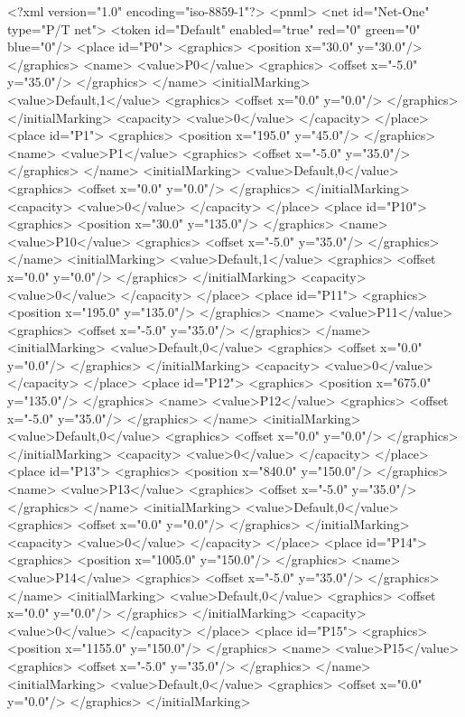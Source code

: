 <?xml version="1.0" encoding="iso-8859-1"?>
<pnml>
<net id="Net-One" type="P/T net">
<token id="Default" enabled="true" red="0" green="0" blue="0"/>
<place id="P0">
<graphics>
<position x="30.0" y="30.0"/>
</graphics>
<name>
<value>P0</value>
<graphics>
<offset x="-5.0" y="35.0"/>
</graphics>
</name>
<initialMarking>
<value>Default,1</value>
<graphics>
<offset x="0.0" y="0.0"/>
</graphics>
</initialMarking>
<capacity>
<value>0</value>
</capacity>
</place>
<place id="P1">
<graphics>
<position x="195.0" y="45.0"/>
</graphics>
<name>
<value>P1</value>
<graphics>
<offset x="-5.0" y="35.0"/>
</graphics>
</name>
<initialMarking>
<value>Default,0</value>
<graphics>
<offset x="0.0" y="0.0"/>
</graphics>
</initialMarking>
<capacity>
<value>0</value>
</capacity>
</place>
<place id="P10">
<graphics>
<position x="30.0" y="135.0"/>
</graphics>
<name>
<value>P10</value>
<graphics>
<offset x="-5.0" y="35.0"/>
</graphics>
</name>
<initialMarking>
<value>Default,1</value>
<graphics>
<offset x="0.0" y="0.0"/>
</graphics>
</initialMarking>
<capacity>
<value>0</value>
</capacity>
</place>
<place id="P11">
<graphics>
<position x="195.0" y="135.0"/>
</graphics>
<name>
<value>P11</value>
<graphics>
<offset x="-5.0" y="35.0"/>
</graphics>
</name>
<initialMarking>
<value>Default,0</value>
<graphics>
<offset x="0.0" y="0.0"/>
</graphics>
</initialMarking>
<capacity>
<value>0</value>
</capacity>
</place>
<place id="P12">
<graphics>
<position x="675.0" y="135.0"/>
</graphics>
<name>
<value>P12</value>
<graphics>
<offset x="-5.0" y="35.0"/>
</graphics>
</name>
<initialMarking>
<value>Default,0</value>
<graphics>
<offset x="0.0" y="0.0"/>
</graphics>
</initialMarking>
<capacity>
<value>0</value>
</capacity>
</place>
<place id="P13">
<graphics>
<position x="840.0" y="150.0"/>
</graphics>
<name>
<value>P13</value>
<graphics>
<offset x="-5.0" y="35.0"/>
</graphics>
</name>
<initialMarking>
<value>Default,0</value>
<graphics>
<offset x="0.0" y="0.0"/>
</graphics>
</initialMarking>
<capacity>
<value>0</value>
</capacity>
</place>
<place id="P14">
<graphics>
<position x="1005.0" y="150.0"/>
</graphics>
<name>
<value>P14</value>
<graphics>
<offset x="-5.0" y="35.0"/>
</graphics>
</name>
<initialMarking>
<value>Default,0</value>
<graphics>
<offset x="0.0" y="0.0"/>
</graphics>
</initialMarking>
<capacity>
<value>0</value>
</capacity>
</place>
<place id="P15">
<graphics>
<position x="1155.0" y="150.0"/>
</graphics>
<name>
<value>P15</value>
<graphics>
<offset x="-5.0" y="35.0"/>
</graphics>
</name>
<initialMarking>
<value>Default,0</value>
<graphics>
<offset x="0.0" y="0.0"/>
</graphics>
</initialMarking>

